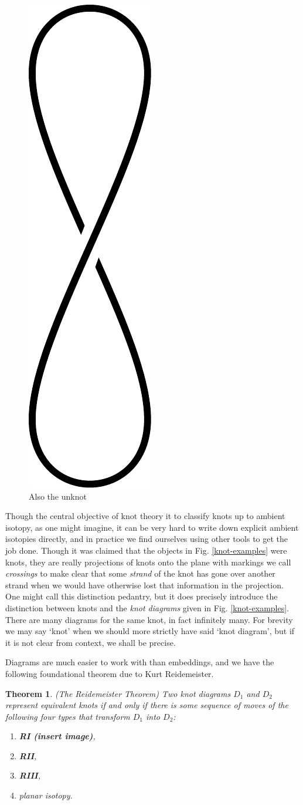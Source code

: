 \documentclass[12pt]{report}
\newcommand{\notered}[1]{{\color{Red} \textbf{#1}}}
\newtheorem*{theorem}{Theorem}
\begin{document}
\begin{figure}[hbt]
	\centering
	\includegraphics[width=0.25\linewidth]{graphics/unknot_twisted}
	\caption{Also the unknot}
	\label{fig:unknot_twisted}
\end{figure}

Though the central objective of knot theory it to classify knots up to ambient isotopy, as one might imagine, it can be very hard to write down explicit ambient isotopies directly, and in practice we find ourselves using other tools to get the job done. Though it was claimed that the objects in Fig. \ref{knot-examples} were knots, they are really projections of knots onto the plane with markings we call \textit{crossings} to make clear that some \textit{strand} of the knot has gone over another strand when we would have otherwise lost that information in the projection. One might call this distinction pedantry, but it does precisely introduce the distinction between knots and the \textit{knot diagrams} given in Fig. \ref{knot-examples}. There are many diagrams for the same knot, in fact infinitely many. For brevity we may say `knot' when we should more strictly have said `knot diagram', but if it is not clear from context, we shall be precise.

Diagrams are much easier to work with than embeddings, and we have the following foundational theorem due to Kurt Reidemeister.
\begin{theorem}(The Reidemeister Theorem)
Two knot diagrams $D_{1}$ and $D_{2}$ represent equivalent knots if and only if there is some sequence of moves of the following four types that transform $D_{1}$ into $D_{2}$:
\begin{enumerate}[(1)]
	\item \notered{RI (insert image)},
	\item \notered{RII},
	\item \notered{RIII},
	\item planar isotopy.
\end{enumerate}
\end{theorem}
\end{document}
